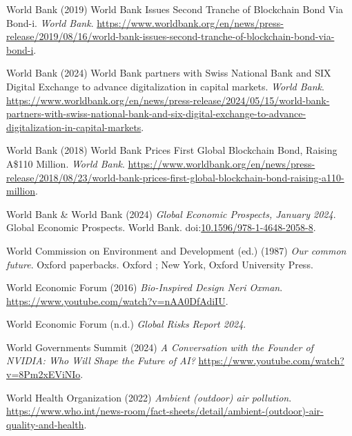 \documentclass[
  letterpaper,
  DIV=11,
  numbers=noendperiod]{scrartcl}
\newlength{\cslhangindent}
\newenvironment{CSLReferences}[2] %
 {\begin{list}{}{%
  \setlength{\itemindent}{0pt}
  \setlength{\leftmargin}{0pt}
  \setlength{\parsep}{0pt}
  \ifodd #1
   \setlength{\leftmargin}{\cslhangindent}
   \setlength{\itemindent}{-1\cslhangindent}
  \fi
  \setlength{\itemsep}{#2\baselineskip}}}
 {\end{list}}
\begin{document}
\begin{CSLReferences}{0}{1}
World Bank (2019) World {Bank Issues Second Tranche} of {Blockchain Bond
Via Bond-i}. \emph{World Bank}.
\url{https://www.worldbank.org/en/news/press-release/2019/08/16/world-bank-issues-second-tranche-of-blockchain-bond-via-bond-i}.

World Bank (2024) World {Bank} partners with {Swiss National Bank} and
{SIX Digital Exchange} to advance digitalization in capital markets.
\emph{World Bank}.
\url{https://www.worldbank.org/en/news/press-release/2024/05/15/world-bank-partners-with-swiss-national-bank-and-six-digital-exchange-to-advance-digitalization-in-capital-markets}.

World Bank (2018) World {Bank Prices First Global Blockchain Bond},
{Raising A}\$110 {Million}. \emph{World Bank}.
\url{https://www.worldbank.org/en/news/press-release/2018/08/23/world-bank-prices-first-global-blockchain-bond-raising-a110-million}.

World Bank \& World Bank (2024) \emph{Global {Economic Prospects},
{January} 2024}. Global {Economic Prospects}. World Bank.
doi:\href{https://doi.org/10.1596/978-1-4648-2058-8}{10.1596/978-1-4648-2058-8}.

World Commission on Environment and Development (ed.) (1987) \emph{Our
common future}. Oxford paperbacks. Oxford ; New York, Oxford University
Press.

World Economic Forum (2016) \emph{Bio-{Inspired Design} {\textbar} {Neri
Oxman}}. \url{https://www.youtube.com/watch?v=nAA0DfAdiIU}.

World Economic Forum (n.d.) \emph{Global {Risks Report} 2024}.

World Governments Summit (2024) \emph{A {Conversation} with the
{Founder} of {NVIDIA}: {Who Will Shape} the {Future} of {AI}?}
\url{https://www.youtube.com/watch?v=8Pm2xEViNIo}.

World Health Organization (2022) \emph{Ambient (outdoor) air pollution}.
\url{https://www.who.int/news-room/fact-sheets/detail/ambient-(outdoor)-air-quality-and-health}.


\end{CSLReferences}
\end{document}
